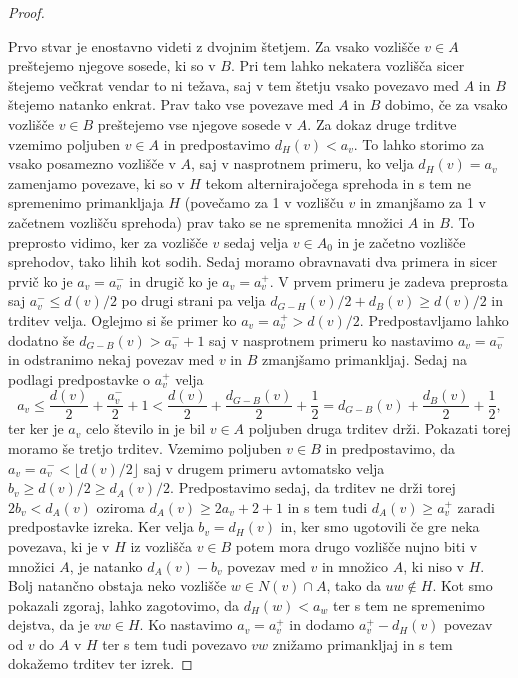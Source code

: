 \documentclass[12pt,a4paper,twoside]{article}
\theoremstyle{definition} %
\theoremstyle{plain} %
\numberwithin{equation}{section}  %
\begin{document}
\begin{proof}
\begin{enumerate}
\end{enumerate}
Prvo stvar je enostavno videti z dvojnim štetjem. Za vsako vozlišče $v \in A$ preštejemo njegove sosede, ki so v $B$. Pri tem lahko nekatera vozlišča sicer štejemo večkrat vendar to ni težava, saj v tem štetju vsako povezavo med $A$ in $B$ štejemo natanko enkrat. Prav tako vse povezave med $A$ in $B$ dobimo, če za vsako vozlišče $v \in B$ preštejemo vse njegove sosede v $A$. Za dokaz druge trditve vzemimo poljuben $v \in A$ in predpostavimo $d_H(v) < a_v$. To lahko storimo za vsako posamezno vozlišče v $A$, saj v nasprotnem primeru, ko velja $d_H(v) = a_v$ zamenjamo povezave, ki so v $H$ tekom alternirajočega sprehoda in s tem ne spremenimo primankljaja $H$ (povečamo za 1 v vozlišču $v$ in zmanjšamo za 1 v začetnem vozlišču sprehoda) prav tako se ne spremenita množici $A$ in $B$. To preprosto vidimo, ker za vozlišče $v$ sedaj velja $v \in A_0$ in je začetno vozlišče sprehodov, tako lihih kot sodih. Sedaj moramo obravnavati dva primera in sicer prvič ko je $a_v = a_v^-$ in drugič ko je $a_v = a_v^+$. V prvem primeru je zadeva preprosta saj $a_v^- \le d(v)/2$ po drugi strani pa velja $d_{G-H}(v) /2 + d_B(v) \ge d(v)/2$ in trditev velja. Oglejmo si še primer ko $a_v = a_v^+ > d(v)/2$. Predpostavljamo lahko dodatno še $d_ {G-B}(v) > a_v^- + 1$ saj v nasprotnem primeru ko nastavimo $a_v = a_v^-$ in odstranimo nekaj povezav med $v$ in $B$ zmanjšamo primankljaj. Sedaj na podlagi predpostavke o $a_v^+$ velja
$$a_v \le \frac{d(v)}{2} + \frac{a_v^-}{2} + 1 < \frac{d(v)}{2} + \frac{d_{G-B}(v)}{2} + \frac{1}{2} = d_{G-B}(v) + \frac{d_B(v)}{2} + \frac{1}{2}, $$
ter ker je $a_v$ celo število in je bil $v \in A$ poljuben druga trditev drži. Pokazati torej moramo še tretjo trditev. Vzemimo poljuben $v \in B$ in predpostavimo, da $a_v = a_v^- < \lfloor d(v)/2 \rfloor$ saj v drugem primeru avtomatsko velja $b_v \ge d(v)/2 \ge d_A(v)/2$. Predpostavimo sedaj, da trditev ne drži torej $2b_v < d_A(v)$ oziroma $d_A(v) \ge 2a_v + 2 + 1$ in s tem tudi $d_A(v) \ge a_v^+$ zaradi predpostavke izreka. Ker velja $b_v = d_H(v)$ in, ker smo ugotovili če gre neka povezava, ki je v $H$ iz vozlišča $v \in B$ potem mora drugo vozlišče nujno biti v množici $A$, je natanko $d_A(v) - b_v$ povezav med $v$ in množico $A$, ki niso v $H$. Bolj natančno obstaja neko vozlišče $w \in N(v) \cap A$, tako da $uw \notin H$. Kot smo pokazali zgoraj, lahko zagotovimo, da $d_H(w) < a_w$ ter s tem ne spremenimo dejstva, da je $vw \in H$. Ko nastavimo $a_v = a_v^+$ in dodamo $a_v^+ - d_H(v)$ povezav od $v$ do $A$ v $H$ ter s tem tudi povezavo $vw$ znižamo primankljaj in s tem dokažemo trditev ter izrek.
 \end{proof}
\end{document}
